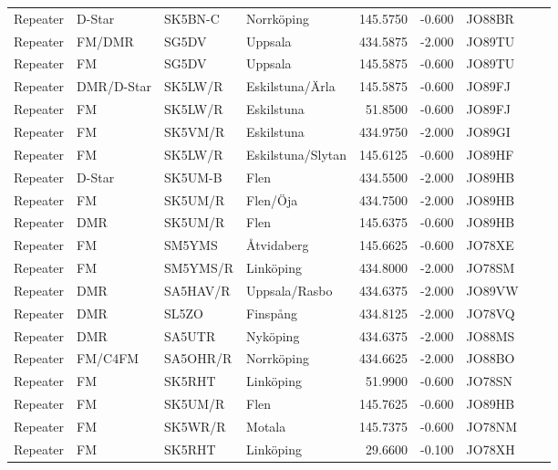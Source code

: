 \begin{longtable}{llllrrlcl}
	Repeater & D-Star     & SK5BN-C  & Norrköping             &   145.5750 &   -0.600 & JO88BR &  &  \\
	Repeater & FM/DMR     & SG5DV    & Uppsala                &   434.5875 &   -2.000 & JO89TU &  &  \\
	Repeater & FM         & SG5DV    & Uppsala                &   145.5875 &   -0.600 & JO89TU &  &  \\
	Repeater & DMR/D-Star & SK5LW/R  & Eskilstuna/Ärla        &   145.5875 &   -0.600 & JO89FJ &  &  \\
	Repeater & FM         & SK5LW/R  & Eskilstuna             &    51.8500 &   -0.600 & JO89FJ &  &  \\
	Repeater & FM         & SK5VM/R  & Eskilstuna             &   434.9750 &   -2.000 & JO89GI &  &  \\
	Repeater & FM         & SK5LW/R  & Eskilstuna/Slytan      &   145.6125 &   -0.600 & JO89HF &  &  \\
	Repeater & D-Star     & SK5UM-B  & Flen                   &   434.5500 &   -2.000 & JO89HB &  &  \\
	Repeater & FM         & SK5UM/R  & Flen/Öja               &   434.7500 &   -2.000 & JO89HB &  &  \\
	Repeater & DMR        & SK5UM/R  & Flen                   &   145.6375 &   -0.600 & JO89HB &  &  \\
	Repeater & FM         & SM5YMS   & Åtvidaberg             &   145.6625 &   -0.600 & JO78XE &  &  \\
	Repeater & FM         & SM5YMS/R & Linköping              &   434.8000 &   -2.000 & JO78SM &  &  \\
	Repeater & DMR        & SA5HAV/R & Uppsala/Rasbo          &   434.6375 &   -2.000 & JO89VW &  &  \\
	Repeater & DMR        & SL5ZO    & Finspång               &   434.8125 &   -2.000 & JO78VQ &  &  \\
	Repeater & DMR        & SA5UTR   & Nyköping               &   434.6375 &   -2.000 & JO88MS &  &  \\
	Repeater & FM/C4FM    & SA5OHR/R & Norrköping             &   434.6625 &   -2.000 & JO88BO &  &  \\
	Repeater & FM         & SK5RHT   & Linköping              &    51.9900 &   -0.600 & JO78SN &  &  \\
	Repeater & FM         & SK5UM/R  & Flen                   &   145.7625 &   -0.600 & JO89HB &  &  \\
	Repeater & FM         & SK5WR/R  & Motala                 &   145.7375 &   -0.600 & JO78NM &  &  \\
	Repeater & FM         & SK5RHT   & Linköping              &    29.6600 &   -0.100 & JO78XH &  &
\end{longtable}

